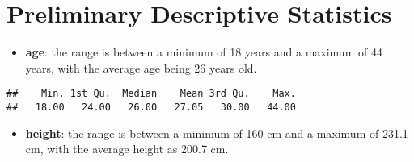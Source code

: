 \documentclass[
]{book}
\newenvironment{Shaded}{\begin{snugshade}}{\end{snugshade}}
\newcommand{\CommentTok}[1]{\textcolor[rgb]{0.56,0.35,0.01}{\textit{#1}}}
\newcommand{\DecValTok}[1]{\textcolor[rgb]{0.00,0.00,0.81}{#1}}
\newcommand{\FunctionTok}[1]{\textcolor[rgb]{0.13,0.29,0.53}{\textbf{#1}}}
\newcommand{\NormalTok}[1]{#1}
\newcommand{\OtherTok}[1]{\textcolor[rgb]{0.56,0.35,0.01}{#1}}
\newcommand{\SpecialCharTok}[1]{\textcolor[rgb]{0.81,0.36,0.00}{\textbf{#1}}}
\providecommand{\tightlist}{%
  \setlength{\itemsep}{0pt}\setlength{\parskip}{0pt}}
\theoremstyle{definition}
\theoremstyle{definition}
\theoremstyle{definition}
\theoremstyle{definition}
\theoremstyle{remark}
\begin{document}
\begin{Shaded}
\end{Shaded}

\hypertarget{preliminary-descriptive-statistics}{%
\section{Preliminary Descriptive Statistics}\label{preliminary-descriptive-statistics}}

\begin{itemize}
\tightlist
\item
  \textbf{age}: the range is between a minimum of 18 years and a maximum of 44 years, with the average age being 26 years old.
\end{itemize}

\begin{Shaded}
\end{Shaded}

\begin{verbatim}
##    Min. 1st Qu.  Median    Mean 3rd Qu.    Max. 
##   18.00   24.00   26.00   27.05   30.00   44.00
\end{verbatim}

\begin{itemize}
\tightlist
\item
  \textbf{height}: the range is between a minimum of 160 cm and a maximum of 231.1 cm, with the average height as 200.7 cm.
\end{itemize}

\begin{Shaded}
\end{Shaded}
\end{document}
